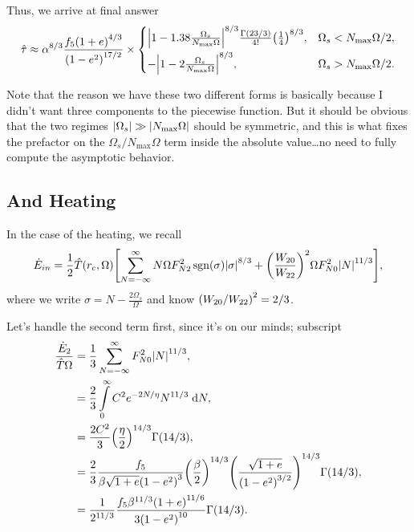 \documentclass[11pt,
        usenames, %
        dvipsnames %
    ]{article}
\DeclareMathOperator{\sgn}{sgn}
\DeclarePairedDelimiter\abs{\lvert}{\rvert}
\DeclarePairedDelimiter\p{\lparen}{\rparen}
\DeclarePairedDelimiter\s{\lbrack}{\rbrack}
\begin{document}
Thus, we arrive at final answer
\begin{equation}
    \hat{\tau} \approx \alpha^{8/3}
        \frac{f_5\p*{1 + e}^{4/3}}{\p*{1 - e^2}^{17/2}} \times
    \begin{cases}
        \abs*{1 - 1.38\frac{\Omega_s}{N_{\max}\Omega}}^{8/3}
            \frac{\Gamma(23/3)}{4!}\p*{\frac{1}{4}}^{8/3},
            & \Omega_s < N_{\max}\Omega / 2,\\[5pt]
        -\abs*{1 - 2\frac{\Omega_s}{N_{\max}\Omega}}^{8/3},
            & \Omega_s > N_{\max}\Omega / 2.
    \end{cases}\label{eq:traveling_torque}
\end{equation}

Note that the reason we have these two different forms is basically because I
didn't want three components to the piecewise function. But it should be obvious
that the two regimes $\abs*{\Omega_s} \gg \abs*{N_{\max}\Omega}$ should be
symmetric, and this is what fixes the prefactor on the $\Omega_s /
N_{\max}\Omega$ term inside the absolute value\dots no need to fully compute the
asymptotic behavior.

\subsection{And Heating}

In the case of the heating, we recall
\begin{align}
     \dot{E}_{in} = \frac{1}{2}\hat{T}\p*{r_c, \Omega}\s*{
         \sum\limits_{N = -\infty}^\infty
            N\Omega F_{N2}^2 \sgn \p*{\sigma} \abs*{\sigma}^{8/3}
            + \p*{\frac{W_{20}}{W_{22}}}^2\Omega F_{N0}^2 \abs*{N}^{11/3}},
\end{align}
where we write $\sigma = N - \frac{2\Omega_s}{\Omega}$ and know $\p*{W_{20} /
W_{22}}^2 = 2/3$.

Let's handle the second term first, since it's on our minds; subscript
\begin{align}
    \frac{\dot{E}_2}{\hat{T}\Omega}
        &= \frac{1}{3} \sum\limits_{N = -\infty}^\infty
            F_{N0}^2\abs*{N}^{11/3},\\
        &= \frac{2}{3}\int\limits_0^\infty C^2e^{-2N/\eta}N^{11/3}\;\mathrm{d}N,\\
        &= \frac{2C^2}{3}\p*{\frac{\eta}{2}}^{14/3}\Gamma(14/3),\\
        &= \frac{2}{3}\frac{f_5}{\beta\sqrt{1 + e}\p*{1 - e^2}^3}
            \p*{\frac{\beta}{2}}^{14/3}\p*{\frac{\sqrt{1 + e}}{\p*{1 -
                e^2}^{3/2}}}^{14/3} \Gamma(14/3),\\
        &= \frac{1}{2^{11/3}}
            \frac{f_5 \beta^{11/3}\p*{1 + e}^{11/6}}{3\p*{1 - e^2}^{10}}
            \Gamma\p*{14/3}.
\end{align}
\end{document}
